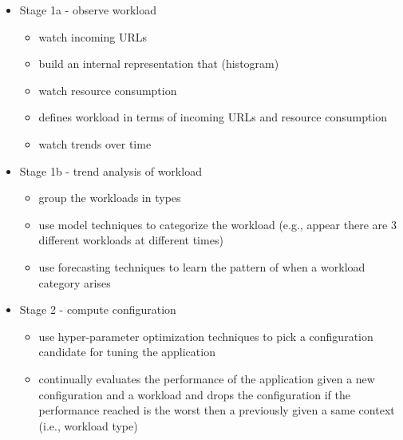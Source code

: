  \begin{itemize}

   \item Stage 1a - observe workload

     \begin{itemize}

       \item watch incoming URLs

       \item build an internal representation that (histogram)

       \item watch resource consumption

       \item defines workload in terms of incoming URLs and resource consumption

       \item watch trends over time

     \end{itemize}

   \item Stage 1b - trend analysis of workload

     \begin{itemize}

       \item group the workloads in types

       \item use model techniques to categorize the workload (e.g., appear there
         are 3 different workloads at different times)

       \item use forecasting techniques to learn the pattern of when a workload category arises

     \end{itemize}

   \item Stage 2 - compute configuration

      \begin{itemize}

        \item use hyper-parameter optimization techniques to pick a
          configuration candidate for tuning the application

        \item continually evaluates the performance of the application given a
          new configuration and a workload and drops the configuration if the
          performance reached is the worst then a previously given a same context
          (i.e., workload type) 


\end{itemize}
\end{itemize}
